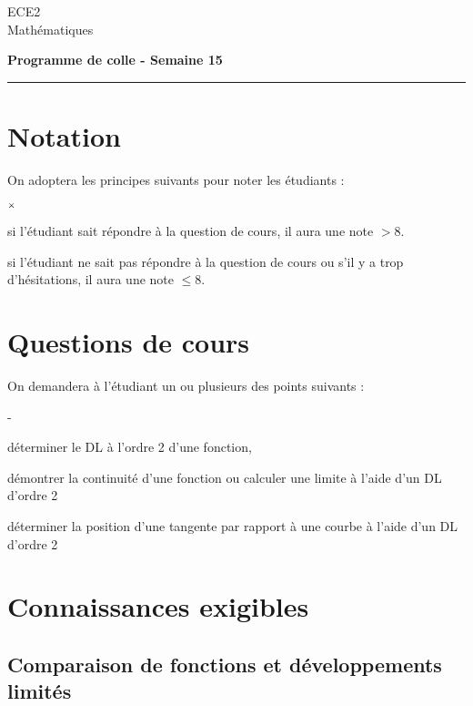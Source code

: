 \documentclass[11pt]{article}%
\begin{document}
\begin{flushleft}
ECE2 \\
Mathématiques
\end{flushleft}


\vspace{0.1cm}

\begin{center}
\textbf{\Large{Programme de colle - Semaine 15}}
\end{center}

\hrule

\vspace*{0,2cm}

\section*{Notation}

\noindent
On adoptera les principes suivants pour noter les étudiants :
\begin{noliste}{$\scriptstyle \times$}
\item si l'étudiant sait répondre à la question de cours, il 
aura une note $>8$.
\item si l'étudiant ne sait pas répondre à la question de 
cours ou s'il y a trop d'hésitations, il aura une note $\leq 8$.
\end{noliste}


\section*{Questions de cours}

\noindent
On demandera à l'étudiant un ou plusieurs des points suivants :
\begin{noliste}{-}
  \item déterminer le DL à l'ordre 2 d'une fonction,
  
  \item démontrer la continuité d'une fonction ou calculer une limite à 
  l'aide d'un DL d'ordre 2
  
  \item déterminer la position d'une tangente par rapport à une courbe à
  l'aide d'un DL d'ordre 2
\end{noliste}




\section*{Connaissances exigibles}


\subsection*{Comparaison de fonctions et développements limités}
\end{document}
